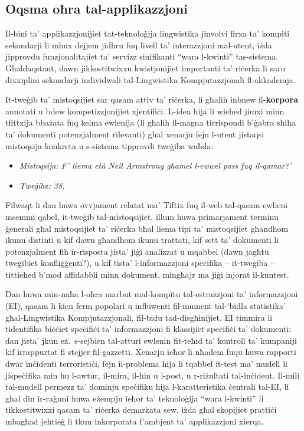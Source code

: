 \begin{multicols}{2}
\subsection{Oqsma oħra tal-applikazzjoni}

Il-bini ta’ applikazzjonijiet tat-teknoloġija lingwistika jinvolvi firxa ta’ kompiti sekondarji li mhux dejjem jidhru fuq livell ta’ interazzjoni mal-utent, iżda jipprovdu funzjonalitajiet ta’ servizz sinifikanti ``wara l-kwinti'' tas-sistema. Għaldaqstant, dawn jikkostitwixxu kwistjonijiet importanti ta’ riċerka li saru dixxiplini sekondarji individwali tal-Lingwistika Kompjutazzjonali fl-akkademja.


It-tweġib ta’ mistoqsijiet sar qasam attiv ta’ riċerka, li għalih  inbnew il-\textbf{korpora} annotati u bdew kompetizzjonijiet xjentifiċi. L-idea hija li wieħed jimxi minn tfittxija bbażata fuq  kelma ewlenija (li għalih il-magna tirrispondi b’ġabra sħiħa ta’ dokumenti potenzjalment rilevanti) għal xenarju fejn l-utent jistaqsi mistoqsija konkreta u s-sistema tipprovdi tweġiba waħda: 

\begin{itemize}
\item[] \textit{Mistoqsija: F’ liema età Neil Armstrong għamel l-ewwel pass fuq il-qamar?'}
\item[] \textit{Tweġiba: 38.}
\end{itemize}

Filwaqt li dan huwa ovvjament relatat ma’ Tiftix fuq il-web tal-qasam ewlieni msemmi qabel, it-tweġib tal-mistoqsijiet, illum huwa primarjament terminu ġenerali għal mistoqsijiet ta’ riċerka bħal liema tipi ta’ mistoqsijiet għandhom ikunu distinti u kif dawn għandhom ikunu trattati, kif sett ta’ dokumenti li potenzjalment fih ir-risposta jista’ jiġi analizzat u mqabbel (dawn jagħtu tweġibiet konfliġġenti?), u kif tista’ l-informazzjoni speċifika -- it-tweġiba -- tittieħed b’mod affidabbli minn dokument, mingħajr ma jiġi injorat il-kuntest.

Dan huwa min-naħa l-oħra marbut mal-kompitu tal-estrazzjoni ta’ informazzjoni (EI), qasam li kien ferm popolari u influwenti fil-mument tal-‘bidla statistika’ għal-Lingwistika Kompjutazzjonali, fil-bidu tad-disgħinijiet. EI timmira li tidentifika biċċiet speċifiċi ta’ informazzjoni fi klassijiet speċifiċi ta’ dokumenti; dan jista’ jkun eż.~s-sejbien tal-atturi ewlenin fit-teħid ta’ kontroll ta’ kumpaniji kif irrappurtat fi stejjer fil-gazzetti. Xenarju ieħor li nħadem fuqu huwa rapporti dwar inċidenti terroristiċi, fejn il-problema hija li tqabbel it-test ma’ mudell li jispeċifika min hu l-awtur, il-mira, il-ħin u l-post, u r-riżultati tal-inċident. Il-mili tal-mudell permezz ta’ dominju speċifiku hija l-karatteristika ċentrali tal-EI, li għal din ir-raġuni huwa eżempju ieħor ta’ teknoloġija ``wara l-kwinti'' li tikkostitwixxi qasam ta’ riċerka demarkata sew, iżda għal skopijiet prattiċi mbagħad jeħtieġ li tkun inkorporata f’ambjent ta’ applikazzjoni xierqa.


\end{multicols}
